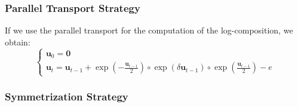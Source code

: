 \subsubsection{Parallel Transport Strategy}

If we use the parallel transport for the computation of the log-composition, we obtain:
\begin{equation}\label{eq:parallel_strategy}
\begin{cases}
\mathbf{u}_0 = \mathbf{0} \\
\mathbf{u}_{t} = \mathbf{u}_{t-1} + \exp(-\frac{\mathbf{u}_{t-1}}{2}) \circ \exp(\delta \mathbf{u}_{t-1}) \circ \exp(\frac{\mathbf{u}_{t-1}}{2}) - e
\end{cases}
\end{equation}

\subsubsection{Symmetrization Strategy}

